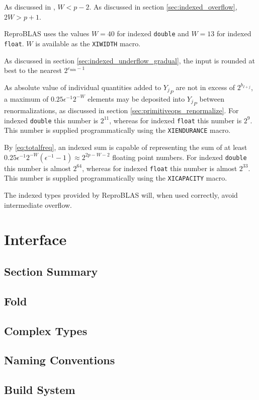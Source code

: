 \documentclass[12pt]{article}
\providecommand{\min}{\ensuremath{\text{min}}}
\theoremstyle{definition}
\numberwithin{equation}{section}
\numberwithin{figure}{section}
\begin{document}
    As discussed in \cite{repsum}, $W < p - 2$. As discussed in section \ref{sec:indexed_overflow}, $2 W > p + 1$.

    ReproBLAS uses the values $W = 40$ for indexed \texttt{double} and $W = 13$ for indexed \texttt{float}. $W$ is available as the \texttt{XIWIDTH} macro.

    As discussed in section \ref{sec:indexed_underflow_gradual}, the input is rounded at best to the nearest $2^{e_{\min} - 1}$

    As absolute value of individual quantities added to ${Y_j}_P$ are not in excess of $2^{b_{I + j}}$, a maximum of $0.25\epsilon^{-1}2^{-W}$ elements may be deposited into ${Y_j}_P$ between renormalizations, as discussed in section \ref{sec:primitiveops_renormalize}. For indexed \texttt{double} this number is $2^{11}$, whereas for indexed \texttt{float} this number is $2^9$. This number is supplied programmatically using the \texttt{XIENDURANCE} macro.

    By \eqref{eq:totalfreq}, an indexed sum is capable of representing the sum of at least $0.25\epsilon^{-1}2^{-W}  (\epsilon^{-1} - 1) \approx 2^{2  p - W - 2}$ floating point numbers. For indexed \texttt{double} this number is almost $2^{64}$, whereas for indexed \texttt{float} this number is almost $2^{33}$. This number is supplied programmatically using the \texttt{XICAPACITY} macro.

    The indexed types provided by ReproBLAS will, when used correctly, avoid intermediate overflow.

\section{Interface}
  \subsection{Section Summary}
  \subsection{Fold}
  \subsection{Complex Types}
  \subsection{Naming Conventions}
  \subsection{Build System}
\end{document}
